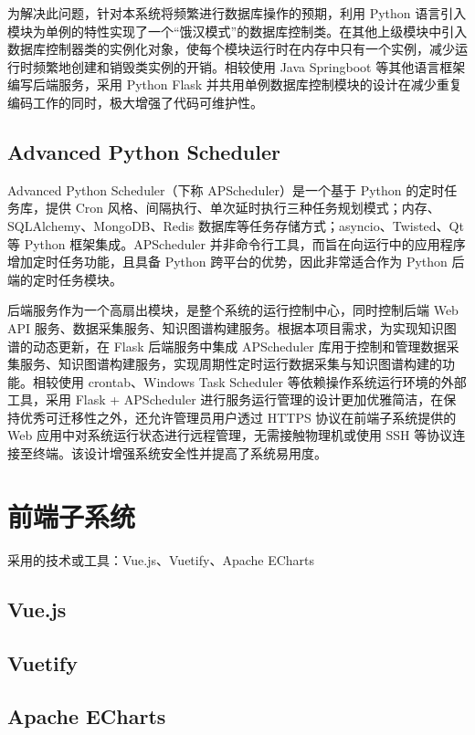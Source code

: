 \documentclass[a4paper,AutoFakeBold,oneside,12pt]{book}
\begin{document}
为解决此问题，针对本系统将频繁进行数据库操作的预期，利用 Python 语言引入模块为单例的特性实现了一个“饿汉模式”的数据库控制类。在其他上级模块中引入数据库控制器类的实例化对象，使每个模块运行时在内存中只有一个实例，减少运行时频繁地创建和销毁类实例的开销。相较使用 Java Springboot 等其他语言框架编写后端服务，采用 Python Flask 并共用单例数据库控制模块的设计在减少重复编码工作的同时，极大增强了代码可维护性。

\subsection{Advanced Python Scheduler}

Advanced Python Scheduler（下称 APScheduler）是一个基于 Python 的定时任务库，提供 Cron 风格、间隔执行、单次延时执行三种任务规划模式；内存、SQLAlchemy、MongoDB、Redis 数据库等任务存储方式；asyncio、Twisted、Qt 等 Python 框架集成。APScheduler 并非命令行工具，而旨在向运行中的应用程序增加定时任务功能，且具备 Python 跨平台的优势，因此非常适合作为 Python 后端的定时任务模块。

后端服务作为一个高扇出模块，是整个系统的运行控制中心，同时控制后端 Web API 服务、数据采集服务、知识图谱构建服务。根据本项目需求，为实现知识图谱的动态更新，在 Flask 后端服务中集成 APScheduler 库用于控制和管理数据采集服务、知识图谱构建服务，实现周期性定时运行数据采集与知识图谱构建的功能。相较使用 crontab、Windows Task Scheduler 等依赖操作系统运行环境的外部工具，采用 Flask + APScheduler 进行服务运行管理的设计更加优雅简洁，在保持优秀可迁移性之外，还允许管理员用户透过 HTTPS 协议在前端子系统提供的 Web 应用中对系统运行状态进行远程管理，无需接触物理机或使用 SSH 等协议连接至终端。该设计增强系统安全性并提高了系统易用度。

\section{前端子系统}

采用的技术或工具：Vue.js、Vuetify、Apache ECharts

\subsection{Vue.js}

\subsection{Vuetify}

\subsection{Apache ECharts}
\end{document}
